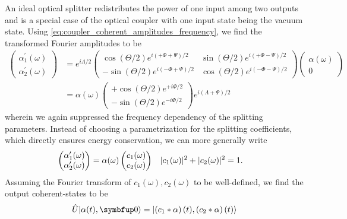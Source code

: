 An ideal optical splitter redistributes the power of one input among two outputs and is a special case of the optical coupler with one input state being the vacuum state.
Using \cref{eq:coupler_coherent_amplitudes_frequency}, we find the transformed Fourier amplitudes to be
\begin{equation}
	\begin{split}
		\begin{pmatrix}
			\alpha_1^\prime(\omega) \\
			\alpha_2^\prime(\omega)
		\end{pmatrix}
		&=
		e^{i\Lambda/2}
		\begin{pmatrix}
			\cos(\Theta/2)
			e^{i\left(+\Phi+\Psi\right)/2}
			&
			\sin(\Theta/2)
			e^{i\left(+\Phi-\Psi\right)/2}
			\\
			-
			\sin(\Theta/2)
			e^{i\left(-\Phi+\Psi\right)/2}
			&
			\cos(\Theta/2)
			e^{i\left(-\Phi-\Psi\right)/2}
		\end{pmatrix}
		\begin{pmatrix}
			\alpha(\omega) \\
			0
		\end{pmatrix}
		\\
		&=
		\alpha(\omega)
		\begin{pmatrix}
			+
			\cos(\Theta/2)
			e^{+i\Phi/2}
			\\
			-
			\sin(\Theta/2)
			e^{-i\Phi/2}
		\end{pmatrix}
		e^{i(\Lambda+\Psi)/2}
	\end{split}
\end{equation}
wherein we again suppressed the frequency dependency of the splitting parameters.
Instead of choosing a parametrization for the splitting coefficients, which directly ensures energy conservation, we can more generally write
\begin{align}
	\begin{pmatrix}
		\alpha_1^\prime(\omega) \\
		\alpha_2^\prime(\omega)
	\end{pmatrix}
	&=
	\alpha(\omega)
	\begin{pmatrix}
		c_1(\omega) \\
		c_2(\omega)
	\end{pmatrix}
	&
	\lvert c_1(\omega)\rvert^2
	+
	\lvert c_2(\omega)\rvert^2
	&=
	1
	.
\end{align}
Assuming the Fourier transform of $c_1(\omega),c_2(\omega)$ to be well-defined, we find the output coherent-states to be
\begin{equation}
	\hat{U}
	\ket*{\alpha(t),\vb{0}}
	=
	\ket*{\left(c_1\conv\alpha\right)(t),\left(c_2\conv\alpha\right)(t)}
	\label{eq:splitter_state_convolution}
\end{equation}
